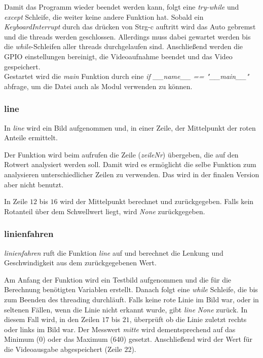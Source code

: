 \documentclass[a4paper, 12pt]{scrartcl}
\begin{document}
Damit das Programm wieder beendet werden kann, folgt eine \textit{try-while} und \textit{except} Schleife, die weiter keine andere Funktion hat. Sobald ein \textit{KeyboardInterrupt} durch das drücken von Strg-c auftritt wird das Auto gebremst und die threads werden geschlossen. Allerdings muss dabei gewartet werden bis die \textit{while}-Schleifen aller threads durchgelaufen sind. Anschließend werden die GPIO einstellungen bereinigt, die Videoaufnahme beendet und das Video gespeichert.\\

Gestartet wird die \textit{main} Funktion durch eine \textit{if \_\_name\_\_ == "\_\_main\_\_"} abfrage, um die Datei auch als Modul verwenden zu können.

\newpage
\subsubsection{line}	%


In \textit{line} wird ein Bild aufgenommen und, in einer Zeile, der Mittelpunkt der roten Anteile ermittelt.

Der Funktion wird beim aufrufen die Zeile (\textit{zeileNr}) übergeben, die auf den Rotwert analysiert werden soll. Damit wird es ermöglicht die selbe Funktion zum analysieren unterschiedlicher Zeilen zu verwenden. Das wird in der finalen Version aber nicht benutzt.

In Zeile $12$ bis $16$ wird der Mittelpunkt berechnet und zurückgegeben. Falls kein Rotanteil über dem Schwellwert liegt, wird \textit{None} zurückgegeben.

\newpage
\subsubsection{linienfahren}	%


\textit{linienfahren} ruft die Funktion \textit{line} auf und berechnet die Lenkung und Geschwindigkeit aus dem zurückgegebenen Wert.

Am Anfang der Funktion wird ein Testbild aufgenommen und die für die Berechnung benötigten Variablen erstellt. Danach folgt eine \textit{while} Schleife, die bis zum Beenden des threading durchläuft.
Falls keine rote Linie im Bild war, oder in seltenen Fällen, wenn die Linie nicht erkannt wurde, gibt \textit{line} \textit{None} zurück. In diesem Fall wird, in den Zeilen $17$ bis $21$, überprüft ob die Linie zuletzt rechts oder links im Bild war. Der Messwert \textit{mitte} wird dementsprechend auf das Minimum (0) oder das Maximum (640) gesetzt. Anschließend wird der Wert für die Videoausgabe abgespeichert (Zeile $22$).
\end{document}
